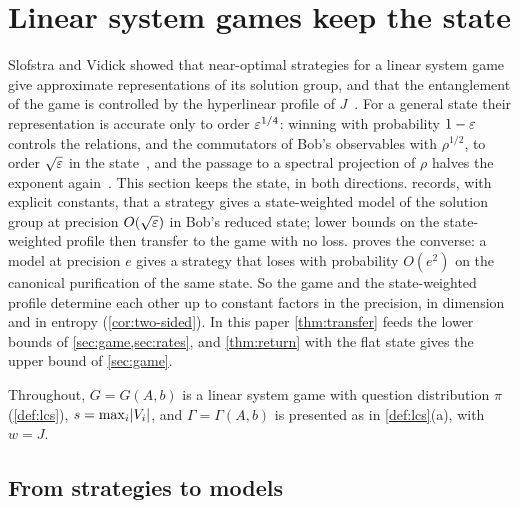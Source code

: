 \section{Linear system games keep the state}\label{sec:transfer}

Slofstra and Vidick showed that near-optimal strategies for a linear system game give approximate representations of its solution group,
and that the entanglement of the game is controlled by the hyperlinear profile of $J$~\cite{SV18}. For a general state their
representation is accurate only to order $\varepsilon^{1/4}$: winning with probability $1-\varepsilon$ controls the relations, and the commutators of
Bob's observables with $\rho^{1/2}$, to order $\sqrt{\varepsilon}$ in the state~\cite[Proposition~5.4]{SV18}, and the passage to a spectral
projection of $\rho$ halves the exponent again~\cite[Theorem~5.1 and Corollary~5.2]{SV18}. This section keeps the state, in both
directions.  records, with explicit constants, that a strategy gives a state-weighted model of the solution group at
precision $O(\sqrt{\varepsilon})$ in Bob's reduced state; lower bounds on the state-weighted profile then transfer to the game with no loss.
 proves the converse: a model at precision $e$ gives a strategy that loses with probability $O(e^2)$ on the canonical
purification of the same state. So the game and the state-weighted profile determine each other up to constant factors in the precision,
in dimension and in entropy (\cref{cor:two-sided}). In this paper \cref{thm:transfer} feeds the lower bounds of
\cref{sec:game,sec:rates}, and \cref{thm:return} with the flat state gives the upper bound of \cref{sec:game}.

Throughout, $G=G(A,b)$ is a linear system game with question distribution $\pi$ (\cref{def:lcs}), $s=\max_i\lvert V_i\rvert$, and
$\Gamma=\Gamma(A,b)$ is presented as in \cref{def:lcs}(a), with $w=J$.

\subsection{From strategies to models}

